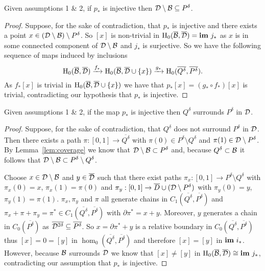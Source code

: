 \begin{lemma}\label{lem:coverage}
    Given assumptions 1 \& 2, if $p_*$ is injective then ${\mathcal{D}}\setminus{\mathcal{B}}\subseteq P^\delta$.
\end{lemma}
\begin{proof}
    Suppose, for the sake of contradiction, that $p_*$ is injective and there exists a point $x\in ({\mathcal{D}}\setminus{\mathcal{B}})\setminus P^\delta$.
    So $[x]$ is non-trivial in $\mathrm{H}_0(\overline{{\mathcal{B}}},\overline{{\mathcal{D}}}) = \mathbf{im}~j_*$ as $x$ is in some connected component of ${\mathcal{D}}\setminus{\mathcal{B}}$ and $j_*$ is surjective.
    So we have the following sequence of maps induced by inclusions
    \[ \mathrm{H}_0(\overline{{\mathcal{B}}},\overline{{\mathcal{D}}})\xrightarrow{f_*} \mathrm{H}_0(\overline{{\mathcal{B}}},\overline{{\mathcal{D}}}\cup\{x\})\xrightarrow{g_*} \mathrm{H}_0(\overline{Q^\delta},\overline{P^\delta}).\]
    As $f_*[x]$ is trivial in $\mathrm{H}_0(\overline{{\mathcal{B}}},\overline{{\mathcal{D}}}\cup\{x\})$ we have that $p_*[x] = (g_*\circ f_*)[x]$ is trivial, contradicting our hypothesis that $p_*$ is injective.
\end{proof}

\begin{lemma}\label{lem:separate}
    Given assumptions 1 \& 2, if the map $p_*$ is injective then $Q^\delta$ surrounds $P^\delta$ in ${\mathcal{D}}$.
\end{lemma}
\begin{proof}
    Suppose, for the sake of contradiction, that $Q^\delta$ does not surround $P^\delta$ in ${\mathcal{D}}$. %
    Then there exists a path $\pi : [0,1]\to\overline{Q^\delta}$ with $\pi(0)\in P^\delta\setminus Q^\delta$ and $\pi(1)\in {\mathcal{D}}\setminus P^\delta$.
    By Lemma~\ref{lem:coverage} we know that ${\mathcal{D}}\setminus{\mathcal{B}}\subset P^\delta$ and, because $Q^\delta\subset{\mathcal{B}}$ it follows that ${\mathcal{D}}\setminus{\mathcal{B}}\subset P^\delta\setminus Q^\delta$.

    Choose $x\in{\mathcal{D}}\setminus {\mathcal{B}}$ and $y\in \overline{{\mathcal{D}}}$ such that there exist paths $\pi_x : [0,1]\to P^\delta\setminus Q^\delta$ with $\pi_x(0) = x$, $\pi_x(1) = \pi(0)$ and $\pi_y : [0,1]\to \overline{D}\cup ({\mathcal{D}}\setminus P^\delta)$ with $\pi_y(0) = y$, $\pi_y(1) = \pi(1)$.
    $\pi_x, \pi_y$ and $\pi$ all generate chains in $C_1(\overline{Q^\delta}, \overline{P^\delta})$ and $\pi_x + \pi + \pi_y = \pi^*\in C_1(\overline{Q^\delta}, \overline{P^\delta})$ with $\partial\pi^* = x + y$.
    Moreover, $y$ generates a chain in $C_0(\overline{P^\delta})$ as $\overline{{\mathcal{D}}^{2\delta}}\subseteq\overline{P^\delta}$.
    So $x = \partial\pi^* + y$ is a relative boundary in $C_0(\overline{Q^\delta}, \overline{P^\delta})$ thus $[x] = 0 = [y]$ in $\hom_0(\overline{Q^\delta}, \overline{P^\delta})$ and therefore $[x] = [y]$ in $\mathbf{im}~i_*$.
    However, because ${\mathcal{B}}$ surrounds ${\mathcal{D}}$ we know that $[x]\neq [y]$ in $\mathrm{H}_0(\overline{{\mathcal{B}}}, \overline{{\mathcal{D}}})\cong \mathbf{im}~j_*$, contradicting our assumption that $p_*$ is injective.
\end{proof}


